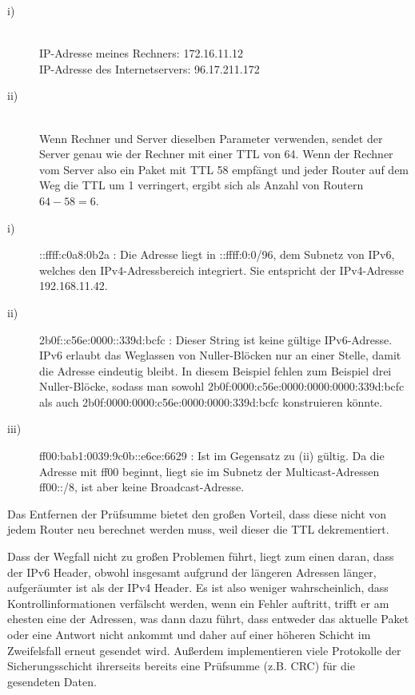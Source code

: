 \documentclass{../exercisesheet}
\begin{document}
\begin{exercise}{4}
\begin{subexercise}
\begin{description}
\item[i)] \ \\
IP-Adresse meines Rechners: 172.16.11.12\\
IP-Adresse des Internetservers: 96.17.211.172
\item[ii)] \ \\
Wenn Rechner und Server dieselben Parameter verwenden, sendet der Server genau wie der Rechner mit einer TTL von 64. Wenn der Rechner vom Server also ein Paket mit TTL 58 empfängt und jeder Router auf dem Weg die TTL um 1 verringert, ergibt sich als Anzahl von Routern $64-58=6$.
\end{description}
\end{subexercise}
\begin{subexercise}
\begin{description}
\item[i)] ::ffff:c0a8:0b2a : Die Adresse liegt in ::ffff:0:0/96, dem Subnetz von IPv6, welches den IPv4-Adressbereich integriert. Sie entspricht der IPv4-Adresse 192.168.11.42.
\item[ii)] 2b0f::c56e:0000::339d:bcfc : Dieser String ist keine gültige IPv6-Adresse. IPv6 erlaubt das Weglassen von Nuller-Blöcken nur an einer Stelle, damit die Adresse eindeutig bleibt. In diesem Beispiel fehlen zum Beispiel drei Nuller-Blöcke, sodass man sowohl 2b0f:0000:c56e:0000:0000:0000:339d:bcfc als auch 2b0f:0000:0000:c56e:0000:0000:339d:bcfc konstruieren könnte.
\item[iii)] ff00:bab1:0039:9c0b::e6ce:6629 : Ist im Gegensatz zu (ii) gültig. Da die Adresse mit ff00 beginnt, liegt sie im Subnetz der Multicast-Adressen ff00::/8, ist aber keine Broadcast-Adresse.
\end{description}
\end{subexercise}
\begin{subexercise}
Das Entfernen der Prüfsumme bietet den großen Vorteil, dass diese nicht von jedem Router neu berechnet werden muss, weil dieser die TTL dekrementiert.

Dass der Wegfall nicht zu großen Problemen führt, liegt zum einen daran, dass der IPv6 Header, obwohl insgesamt aufgrund der längeren Adressen länger, aufgeräumter ist als der IPv4 Header. Es ist also weniger wahrscheinlich, dass Kontrollinformationen verfälscht werden, wenn ein Fehler auftritt, trifft er am ehesten eine der Adressen, was dann dazu führt, dass entweder das aktuelle Paket oder eine Antwort nicht ankommt und daher auf einer höheren Schicht im Zweifelsfall erneut gesendet wird. Außerdem implementieren viele Protokolle der Sicherungsschicht ihrerseits bereits eine Prüfsumme (z.B. CRC) für die gesendeten Daten.
\end{subexercise}
\end{exercise}
\end{document}
